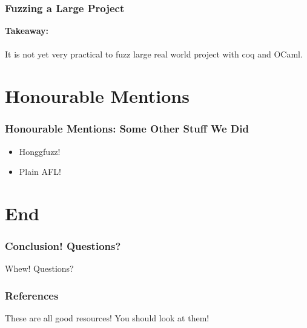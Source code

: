 \documentclass{beamer}
\begin{document}
\begin{frame}
\frametitle{Fuzzing a Large Project}

\textbf{Takeaway:} \\~\\
It is not yet very practical to fuzz large real world project with coq and OCaml.
    
\end{frame}
\section{Honourable Mentions}

\begin{frame}
  \frametitle{Honourable Mentions: Some Other Stuff We Did}

  \begin{itemize}
  \item Honggfuzz!
  \item Plain AFL!
  \end{itemize}
\end{frame}

\section{End}

\begin{frame}
  \frametitle{Conclusion! Questions?}

  \huge{Whew! Questions?}
\end{frame}

\begin{frame}
  \frametitle{References}

  \nocite{*}
  \printbibliography

  These are all good resources! You should look at them!
\end{frame}
\end{document}
